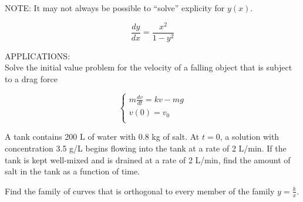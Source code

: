 \documentclass[11pt]{article}
\begin{document}
\vspace{2in}

NOTE:  It may not always be possible to ``solve'' explicity for $y(x)$.

\begin{displaymath}
  \frac{dy}{dx} = \frac{x^2}{1-y^2}
\end{displaymath}


\vspace{3.5in}

APPLICATIONS:\\

Solve the initial value problem for the velocity of a falling object that is subject to a drag force

\begin{displaymath}
  \left\{ \begin{array}{ll}
  m\frac{dv}{dt} = kv-mg\\
v(0) = v_0 \\
\end{array} \right.
\end{displaymath}

\pagebreak


A tank contains 200 L of water with 0.8 kg of salt.   At $t=0$, a solution with concentration 3.5 g/L begins
flowing into the tank at a rate of 2 L/min. If the tank is kept well-mixed and is drained at a rate of 2 L/min,
find the amount of salt in the tank as a function of time.


\vspace{4.5in}

Find the family of curves that is orthogonal to every member of the family $y=\frac{k}{x}$.
%
%
%
%
\end{document}
